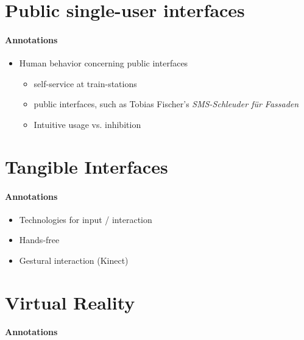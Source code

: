 
\section{Public single-user interfaces}
\label{related_work_single}

\paragraph{Annotations}

\begin{itemize}
	\item Human behavior concerning public interfaces
	\begin{itemize}
		\item self-service at train-stations
		\item public interfaces, such as Tobias Fischer's \textit{SMS-Schleuder für Fassaden}
		\item Intuitive usage vs. inhibition
	\end{itemize}
\end{itemize}

\section{Tangible Interfaces}
\label{related_work_tangible}

\paragraph{Annotations}

\begin{itemize}
	\item Technologies for input / interaction
	\item Hands-free
	\item Gestural interaction (Kinect)
\end{itemize}


\section{Virtual Reality}
\label{related_work_vr}

\paragraph{Annotations}

